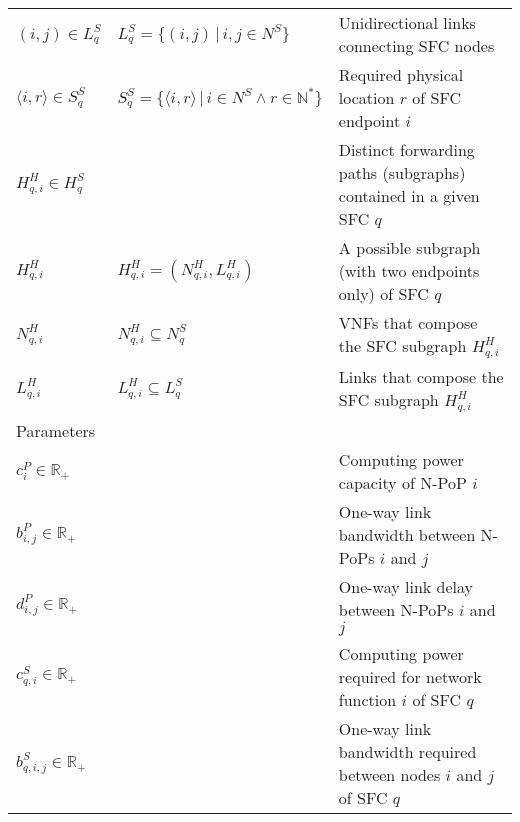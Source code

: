 \begin{tabular}{l l l}
$(i,j) \in L^{S}_q$                  & $L^{S}_q = \{ (i,j)\,\vert\, i,j \in N^{S}\}$                                                     & Unidirectional links connecting SFC nodes\\
$\langle i, r \rangle \in S_q^{S}$   & $S^{S}_q = \{ \langle i, r \rangle\,\vert\, i \in N^{S} \land r \in \mathbb{N}^{*} \}$            & Required physical location $r$ of SFC endpoint $i$\\
$H^{H}_{q,i} \in H^{S}_q$            &                                                                                                   & Distinct forwarding paths (subgraphs) contained in a given SFC $q$\\
$H^{H}_{q,i}$                        & $H^{H}_{q,i} = (N^{H}_{q,i}, L^{H}_{q,i})$                                                        & A possible subgraph (with two endpoints only) of SFC $q$\\
$N^{H}_{q,i}$                        & $N^{H}_{q,i} \subseteq N^{S}_q$                                                                   & VNFs that compose the SFC subgraph $H^{H}_{q,i}$ \\
$L^{H}_{q,i}$                        & $L^{H}_{q,i} \subseteq L^{S}_q$                                                                   & Links that compose the SFC subgraph $H^{H}_{q,i}$\\
Parameters                           &                                                                                                   & \\
$c^{P}_i \in \mathbb{R}_{+}$         &                                                                                                   & Computing power capacity of N-PoP $i$\\
$b^{P}_{i,j} \in \mathbb{R}_{+}$     &                                                                                                   & One-way link bandwidth between N-PoPs $i$ and $j$\\
$d^{P}_{i,j} \in \mathbb{R}_{+}$     &                                                                                                   & One-way link delay between N-PoPs $i$ and $j$\\
$c^{S}_{q,i} \in \mathbb{R}_{+}$     &                                                                                                   & Computing power required for network function $i$ of SFC $q$\\
$b^{S}_{q,i,j} \in \mathbb{R}_{+}$   &                                                                                                   & One-way link bandwidth required between nodes $i$ and $j$ of SFC $q$\\

\end{tabular}

